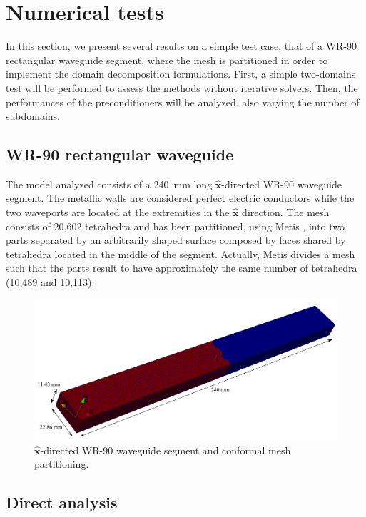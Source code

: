 \section{Numerical tests}

In this section, we present several results on a simple test case, that of a WR-90 rectangular waveguide segment, where the mesh is partitioned in order to implement the domain decomposition formulations. First, a simple two-domains test will be performed to assess the methods without iterative solvers. Then, the performances of the preconditioners will be analyzed, also varying the number of subdomains. %

\subsection{WR-90 rectangular waveguide}

The model analyzed consists of a 240~mm long $\hat{\mathbf{x}}$-directed WR-90 waveguide segment. The metallic walls are considered perfect electric conductors  while the two waveports are located at the extremities in the $\hat{\mathbf{x}}$ direction. The mesh consists of 20,602 tetrahedra and has been partitioned, using Metis \cite{karypis1995metis}, into two parts separated by an arbitrarily shaped surface composed by faces shared by tetrahedra located in the middle of the segment. Actually, Metis divides a mesh such that the parts result to have approximately the same number of tetrahedra (10,489 and 10,113).

\begin{figure}[h!]
\centering
\includegraphics[width=\textwidth]{WR90Part}
\caption{$\hat{\mathbf{x}}$-directed WR-90 waveguide segment and conformal mesh partitioning.}
\label{fig:WR90Part}
\end{figure}

\subsection{Direct analysis}

